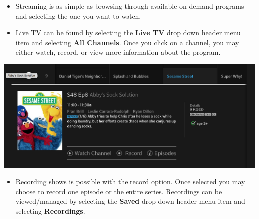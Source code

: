 \documentclass[a4paper, 11pt]{article}
\begin{document}
\begin{itemize}
  \item Streaming is as simple as browsing through available on demand 
  programs and selecting the one you want to watch.
  \item Live TV can be found by selecting the \textbf{Live TV} drop down 
  header menu item and selecting \textbf{All Channels}.  Once you click
  on a channel, you may either watch, record, or view more information
  about the program.
\end{itemize}
\includegraphics[width=\linewidth, keepaspectratio]{seas.png}
\begin{itemize}
  \item Recording shows is possible with the record option.  Once selected
  you may choose to record one episode or the entire series.  Recordings 
  can be viewed/managed by selecting the \textbf{Saved} drop down header
  menu item and selecting \textbf{Recordings}.
\end{itemize}
\end{document}

